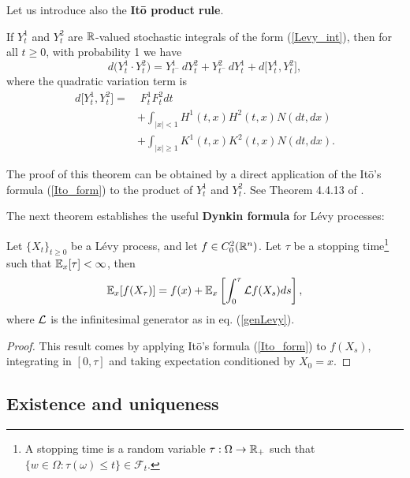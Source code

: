 Let us introduce also the \textbf{It\={o} product rule}.
\begin{Theorem}
 If $Y^1_t$ and $Y^2_t$ are $\mathbb{R}$-valued stochastic integrals of the form (\ref{Levy_int}), then for all $t\geq0$, with probability 1 we have
 \begin{equation}\label{Ito_product}
  d \bigl( Y^1_t \cdot Y^2_t \bigr) = Y^1_{t^-}\,dY^2_t + Y^2_{t^-}\,dY^1_t + d\bigl[ Y^1_t,Y^2_t \bigr],
 \end{equation}
where the quadratic variation term is
\begin{align*}
 d\bigl[ Y^1_t, Y^2_t \bigr] =& \; F^1_t F^2_t dt \\
                              &+ \int_{|x|<1} H^1(t,x) H^2(t,x) N (dt,dx) \\
                              &+ \int_{|x|\geq 1} K^1(t,x) K^2(t,x) N(dt,dx).
\end{align*}
\end{Theorem}
The proof of this theorem can be obtained by a direct application of the It\={o}'s formula (\ref{Ito_form}) to the product of $Y^1_t$ and $Y^2_t$. 
See Theorem 4.4.13 of \cite{Applebaum}.

The next theorem establishes the useful \textbf{Dynkin formula} for Lévy processes:
\begin{Theorem}\label{Dynkin_formula}
 Let $\{X_t\}_{t \ge 0}$ be a Lévy process, and let $f\in C_0^2(\mathbb{R}^n)$. Let $\tau$ be a stopping time\footnote{A stopping time is a random
 variable $\tau : \Omega \to \mathbb{R}_+$ such that $\{w\in\Omega : \tau(\omega) \leq t\} \in \mathcal{F}_t$.} such that
 $\mathbb{E}_x[\tau] < \infty$, then
 \begin{equation}\label{Dynkin_theorem}
  \mathbb{E}_x[f(X_{\tau})] = f(x) +\mathbb{E}_x\left[ \int_0^{\tau} \mathcal{L} f(X_{s})ds \right],
 \end{equation}
 where $\mathcal{L}$ is the infinitesimal generator as in eq. (\ref{genLevy}).
\end{Theorem}
\begin{proof}
 This result comes by applying It\={o}'s formula (\ref{Ito_form}) to $f(X_s)$, integrating in $[0,\tau]$ and taking 
 expectation conditioned by $X_0=x$.
\end{proof}



\subsection{Existence and uniqueness}\label{existence_uniqueness}


